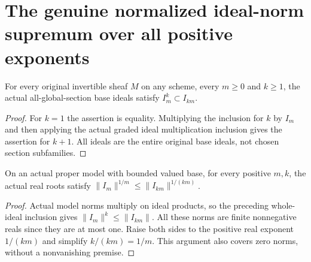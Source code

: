 \section{The genuine normalized ideal-norm supremum over all positive exponents}

\begin{lemma}\label{lem:native-power-base-ideal-power-inclusion}
\leanok
{}
For every original invertible sheaf $M$ on any scheme, every $m\geq0$
and $k\geq1$, the actual all-global-section base ideals satisfy
$I_m^k\subset I_{km}$.
\end{lemma}
\begin{proof}
For $k=1$ the assertion is equality. Multiplying the inclusion for $k$
by $I_m$ and then applying the actual graded ideal multiplication inclusion
gives the assertion for $k+1$. All ideals are the entire original base
ideals, not chosen section subfamilies.
\end{proof}

\begin{lemma}\label{lem:native-base-ideal-root-multiples}
\leanok
{}
On an actual proper model with bounded valued base, for every positive
$m,k$, the actual real roots satisfy
$\|I_m\|^{1/m}\leq\|I_{km}\|^{1/(km)}$.
\end{lemma}
\begin{proof}
Actual model norms multiply on ideal products, so the preceding whole-ideal
inclusion gives $\|I_m\|^k\leq\|I_{km}\|$. All these norms are finite
nonnegative reals since they are at most one. Raise both sides to the
positive real exponent $1/(km)$ and simplify $k/(km)=1/m$. This argument
also covers zero norms, without a nonvanishing premise.
\end{proof}

